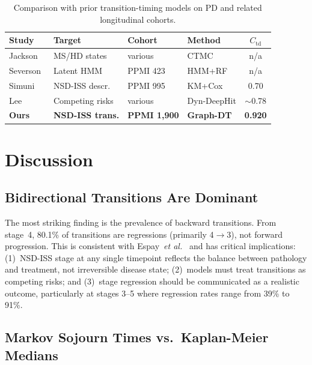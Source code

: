 \begin{table}[!t]
\centering
\caption{Comparison with prior transition-timing models on PD and related longitudinal cohorts.}
\label{p3:tab:competitors}
\scriptsize
\setlength{\tabcolsep}{3pt}
\begin{tabular}{@{}p{1.5cm}p{1.4cm}p{0.9cm}p{1cm}c@{}}
\toprule
Study & Target & Cohort & Method & $C_{\text{td}}$ \\
\midrule
Jackson~\cite{jackson2011} & MS/HD states & various & CTMC & n/a \\
Severson~\cite{severson2021} & Latent HMM & PPMI 423 & HMM+RF & n/a \\
Simuni~\cite{simuni2025} & NSD-ISS descr. & PPMI 995 & KM+Cox & 0.70 \\
Lee~\cite{lee2019} & Competing risks & various & Dyn-DeepHit & $\sim$0.78 \\
\textbf{Ours} & \textbf{NSD-ISS trans.} & \textbf{PPMI 1{,}900} & \textbf{Graph-DT} & \textbf{0.920} \\
\bottomrule
\end{tabular}
\end{table}

\section{Discussion}
\label{p3:sec:discussion}

\subsection{Bidirectional Transitions Are Dominant}

The most striking finding is the prevalence of backward transitions. From stage~4, 80.1\% of transitions are regressions (primarily 4$\to$3), not forward progression. This is consistent with Espay~\textit{et al.}~\cite{espay2025} and has critical implications: (1)~NSD-ISS stage at any single timepoint reflects the balance between pathology and treatment, not irreversible disease state; (2)~models must treat transitions as competing risks; and (3)~stage regression should be communicated as a realistic outcome, particularly at stages 3--5 where regression rates range from 39\% to 91\%.

\subsection{Markov Sojourn Times vs.\ Kaplan-Meier Medians}


